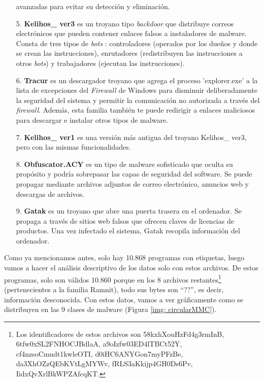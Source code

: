 \begin{enumerate}
\item[] avanzadas para evitar su detección y eliminación.
\item[5.] \textbf{Kelihos\_ ver3} es un troyano tipo \textit{backdoor} que distribuye correos electrónicos que pueden contener enlaces falsos a instaladores de malware. Consta de tres tipos de \textit{bots} \citep{kerkers2014characterisation}: controladores (operados por los dueños y donde se crean las instrucciones), enrutadores (redistribuyen las instrucciones a otros \textit{bots}) y trabajadores (ejecutan las instrucciones).

\item[6.] \textbf{Tracur} es un descargador troyano que agrega el proceso 'explorer.exe' a la lista de excepciones del \textit{Firewall} de Windows para disminuir deliberadamente la seguridad del sistema y permitir la comunicación no autorizada a través del \textit{firewall}. Además, esta familia también te puede redirigir a enlaces maliciosos para descargar e instalar otros tipos de malware.

\item[7.] \textbf{Kelihos\_ ver1} es una versión más antigua del troyano Kelihos\_ ver3, pero con las mismas funcionalidades.

\item[8.] \textbf{Obfuscator.ACY} es un tipo de malware sofisticado que oculta su propósito y podría sobrepasar las capas de seguridad del software.  Se puede propagar mediante archivos adjuntos de correo electrónico, anuncios web y descargas de archivos. 
\item[9.] \textbf{Gatak} es un troyano que abre una puerta trasera en el ordenador. Se propaga a través de sitios web falsos que ofrecen claves de licencias de productos. Una vez infectado el sistema, Gatak recopila información del ordenador.
\end{enumerate} 

Como ya mencionamos antes, solo hay 10.868 programas con etiquetas, luego vamos a hacer el análisis descriptivo de los datos solo con estos archivos. De estos programas, solo son válidos 10.860 porque en los 8 archivos restantes\footnote{Los identificadores de estos archivos son 58kxhXouHzFd4g3rmInB, 6tfw0xSL2FNHOCJBdlaA, a9oIzfw03ED4lTBCt52Y, cf4nzsoCmudt1kwleOTI, d0iHC6ANYGon7myPFzBe, da3XhOZzQEbKVtLgMYWv, fRLS3aKkijp4GH0Ds6Pv, IidxQvXrlBkWPZAfcqKT.} (pertenecientes a la familia Ramnit), todo sus bytes son ``??'', es decir, información desconocida. Con estos datos, vamos a ver gráficamente como se distribuyen en las 9 clases de malware (Figura \ref{img: circularMMC}).

